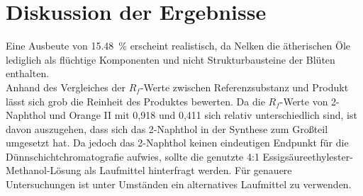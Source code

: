 \newpage
\section{Diskussion der Ergebnisse}
\label{sec:diskussion}

Eine Ausbeute von \SI{15,48}{\percent} erscheint realistisch, da Nelken die ätherischen Öle lediglich als flüchtige Komponenten und nicht Strukturbausteine der Blüten enthalten.\\


Anhand des Vergleiches der $R_f$-Werte zwischen Referenzsubstanz und Produkt lässt sich grob die Reinheit des Produktes bewerten. Da die $R_f$-Werte von 2-Naphthol und Orange II mit 0,918 und 0,411 sich relativ unterschiedlich sind, ist davon auszugehen, dass sich das 2-Naphthol in der Synthese zum Großteil umgesetzt hat. Da jedoch das 2-Naphthol keinen eindeutigen Endpunkt für die Dünnschichtchromatografie aufwies, sollte die genutzte 4:1 Essigsäureethylester-Methanol-Lösung als Laufmittel hinterfragt werden. Für genauere Untersuchungen ist unter Umständen ein alternatives Laufmittel zu verwenden.
